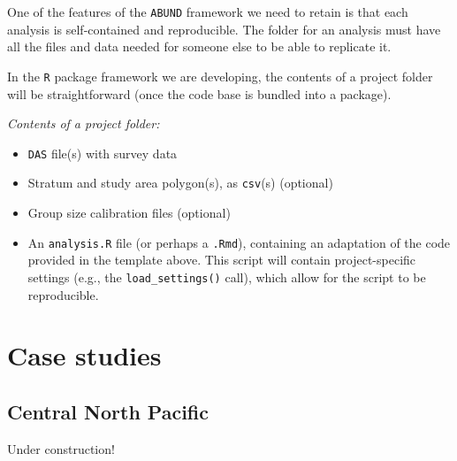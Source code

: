 \documentclass[
]{book}
\providecommand{\tightlist}{%
  \setlength{\itemsep}{0pt}\setlength{\parskip}{0pt}}
\begin{document}
One of the features of the \texttt{ABUND} framework we need to retain is that each analysis is self-contained and reproducible. The folder for an analysis must have all the files and data needed for someone else to be able to replicate it.

In the \texttt{R} package framework we are developing, the contents of a project folder will be straightforward (once the code base is bundled into a package).

\emph{Contents of a project folder:}

\begin{itemize}
\tightlist
\item
  \texttt{DAS} file(s) with survey data\\
\item
  Stratum and study area polygon(s), as \texttt{csv}(s) (optional)\\
\item
  Group size calibration files (optional)\\
\item
  An \texttt{analysis.R} file (or perhaps a \texttt{.Rmd}), containing an adaptation of the code provided in the template above. This script will contain project-specific settings (e.g., the \texttt{load\_settings()} call), which allow for the script to be reproducible.
\end{itemize}

\hypertarget{part-case-studies}{%
\part{Case studies}\label{part-case-studies}}

\hypertarget{casestudies}{%
\chapter{Central North Pacific}\label{casestudies}}

Under construction!
\end{document}
